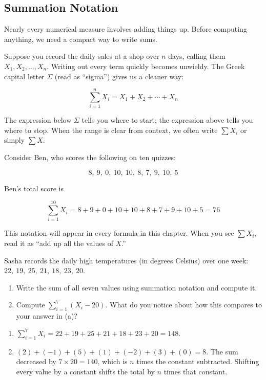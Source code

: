 \subsection{Summation Notation}

Nearly every numerical measure involves adding things up. Before
computing anything, we need a compact way to write sums.

Suppose you record the daily sales at a shop over $n$ days, calling
them $X_1, X_2, \ldots, X_n$. Writing out every term quickly becomes
unwieldy. The Greek capital letter $\Sigma$ (read as ``sigma'') gives
us a cleaner way:

\[
\sum_{i=1}^{n} X_i = X_1 + X_2 + \cdots + X_n
\]

The expression below $\Sigma$ tells you where to start; the expression
above tells you where to stop. When the range is clear from context,
we often write $\sum X_i$ or simply $\sum X$.

Consider Ben, who scores the following on ten quizzes:

\[ 8,\ 9,\ 0,\ 10,\ 10,\ 8,\ 7,\ 9,\ 10,\ 5 \]

Ben's total score is

\[
\sum_{i=1}^{10} X_i = 8 + 9 + 0 + 10 + 10 + 8 + 7 + 9 + 10 + 5 = 76
\]

This notation will appear in every formula in this chapter. When you
see $\sum X_i$, read it as ``add up all the values of $X$.''

\begin{Exercise}[title={Summation Practice}, label={ex:summation_practice}]
Sasha records the daily high temperatures (in degrees Celsius)
over one week: $22,\ 19,\ 25,\ 21,\ 18,\ 23,\ 20$.

\begin{enumerate}
    \item Write the sum of all seven values using summation notation
    and compute it.
    \item Compute $\displaystyle\sum_{i=1}^{7}(X_i - 20)$. What do
    you notice about how this compares to your answer in (a)?
\end{enumerate}
\end{Exercise}

\begin{Answer}[ref={ex:summation_practice}]
\begin{enumerate}
    \item $\displaystyle\sum_{i=1}^{7} X_i = 22 + 19 + 25 + 21 + 18
    + 23 + 20 = 148$.
    \item $(2)+(-1)+(5)+(1)+(-2)+(3)+(0) = 8$. The sum decreased
    by $7 \times 20 = 140$, which is $n$ times the constant
    subtracted. Shifting every value by a constant shifts the
    total by $n$ times that constant.
\end{enumerate}
\end{Answer}

